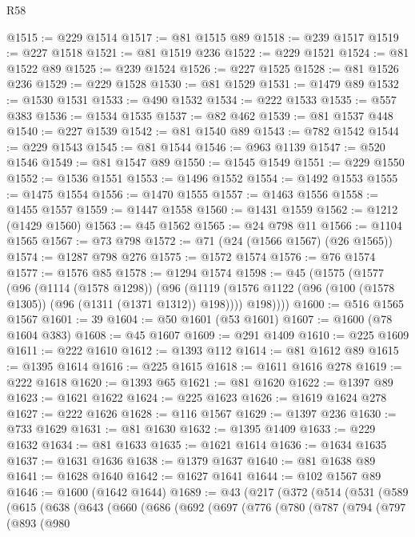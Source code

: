\begin{lexlean}{R58}
\begin{coremodule}
@1515 := @229 @1514
@1517 := @81 @1515 @89
@1518 := @239 @1517
@1519 := @227 @1518
@1521 := @81 @1519 @236
@1522 := @229 @1521
@1524 := @81 @1522 @89
@1525 := @239 @1524
@1526 := @227 @1525
@1528 := @81 @1526 @236
@1529 := @229 @1528
@1530 := @81 @1529
@1531 := @1479 @89
@1532 := @1530 @1531
@1533 := @490 @1532
@1534 := @222 @1533
@1535 := @557 @383
@1536 := @1534 @1535
@1537 := @82 @462
@1539 := @81 @1537 @448
@1540 := @227 @1539
@1542 := @81 @1540 @89
@1543 := @782 @1542
@1544 := @229 @1543
@1545 := @81 @1544
@1546 := @963 @1139
@1547 := @520 @1546
@1549 := @81 @1547 @89
@1550 := @1545 @1549
@1551 := @229 @1550
@1552 := @1536 @1551
@1553 := @1496 @1552
@1554 := @1492 @1553
@1555 := @1475 @1554
@1556 := @1470 @1555
@1557 := @1463 @1556
@1558 := @1455 @1557
@1559 := @1447 @1558
@1560 := @1431 @1559
@1562 := @1212 (@1429 @1560)
@1563 := @45 @1562
@1565 := @24 @798 @11
@1566 := @1104 @1565
@1567 := @73 @798
@1572 := @71 (@24 (@1566 @1567) (@26 @1565))
@1574 := @1287 @798 @276
@1575 := @1572 @1574
@1576 := @76 @1574
@1577 := @1576 @85
@1578 := @1294 @1574
@1598 := @45
    (@1575
      (@1577
        (@96
          (@1114 (@1578 @1298))
          (@96
            (@1119 (@1576 @1122 (@96 (@100 (@1578 @1305)) (@96 (@1311 (@1371 @1312)) @198))))
            @198))))
@1600 := @516 @1565 @1567
@1601 := 39
@1604 := @50 @1601 (@53 @1601)
@1607 := @1600 (@78 @1604 @383)
@1608 := @45 @1607
@1609 := @291 @1409
@1610 := @225 @1609
@1611 := @222 @1610
@1612 := @1393 @112
@1614 := @81 @1612 @89
@1615 := @1395 @1614
@1616 := @225 @1615
@1618 := @1611 @1616 @278
@1619 := @222 @1618
@1620 := @1393 @65
@1621 := @81 @1620
@1622 := @1397 @89
@1623 := @1621 @1622
@1624 := @225 @1623
@1626 := @1619 @1624 @278
@1627 := @222 @1626
@1628 := @116 @1567
@1629 := @1397 @236
@1630 := @733 @1629
@1631 := @81 @1630
@1632 := @1395 @1409
@1633 := @229 @1632
@1634 := @81 @1633
@1635 := @1621 @1614
@1636 := @1634 @1635
@1637 := @1631 @1636
@1638 := @1379 @1637
@1640 := @81 @1638 @89
@1641 := @1628 @1640
@1642 := @1627 @1641
@1644 := @102 @1567 @89
@1646 := @1600 (@1642 @1644)
@1689 := @43
    (@217
      (@372
        (@514
          (@531
            (@589
              (@615
                (@638
                  (@643
                    (@660
                      (@686
                        (@692
                          (@697
                            (@776
                              (@780
                                (@787
                                  (@794
                                    (@797
                                      (@893
                                        (@980

\end{coremodule}
\end{lexlean}
